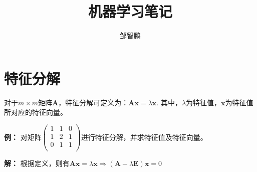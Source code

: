 \documentclass[12pt,a4paper]{article}
\title{机器学习笔记}
\author{邹智鹏}
\begin{document}
  \maketitle
  \tableofcontents
  \newpage
  \section{特征分解}
  对于$m\times m$矩阵$\mathbf{A}$，特征分解可定义为：$\mathbf{A}\mathbf{x}=\lambda \mathbf{x}$. 其中，$\lambda$为特征值，$\mathbf{x}$为特征值所对应的特征向量。

  \textbf{例：} 对矩阵$\left(\begin{array}{ccc}
    1 & 1 & 0 \\ 
    1 & 2 & 1 \\ 
    0 & 1 & 1 \\ 
  \end{array}\right)$进行特征分解，并求特征值及特征向量。

  \textbf{解：} 根据定义，则有$\mathbf{Ax} = \lambda \mathbf{x} \Rightarrow \left(\mathbf{A} - \lambda \mathbf{E}\right)\mathbf{x}=0$
  
\end{document}
